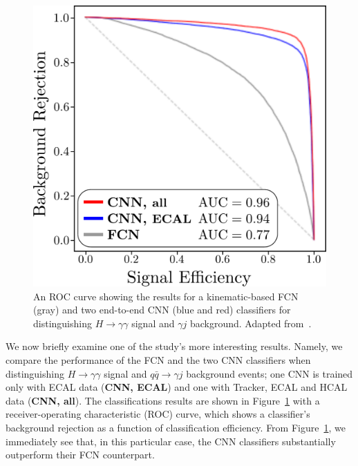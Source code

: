 \documentclass[11pt, a4paper]{article}
\begin{document}
\begin{figure}
    \centering
    \includegraphics[width=\linewidth]{raster/raster-svg/roc.pdf}
    \vspace{-8mm}
    \null \hspace{10mm}\caption{An ROC curve showing the results for a kinematic-based FCN (gray) and two end-to-end CNN (blue and red) classifiers for distinguishing $ H \to \gamma \gamma $ signal and $ \gamma j $ background.
    Adapted from~\cite{andrews-higgs}.}
    \label{fig:andrews-roc}
\end{figure}

We now briefly examine one of the study's more interesting results.
Namely, we compare the performance of the FCN and the two CNN classifiers when distinguishing $ H \to \gamma \gamma $ signal and $ q \bar{q} \to \gamma j $ background events; one CNN is trained only with ECAL data (\textbf{CNN, \small{ECAL}}) and one with Tracker, ECAL and HCAL data (\textbf{CNN, \small{all}}).
The classifications results are shown in Figure~\ref{fig:andrews-roc} with a receiver-operating characteristic (ROC) curve, which shows a classifier's background rejection as a function of classification efficiency.
From Figure~\ref{fig:andrews-roc}, we immediately see that, in this particular case, the CNN classifiers substantially outperform their FCN counterpart.
\end{document}
